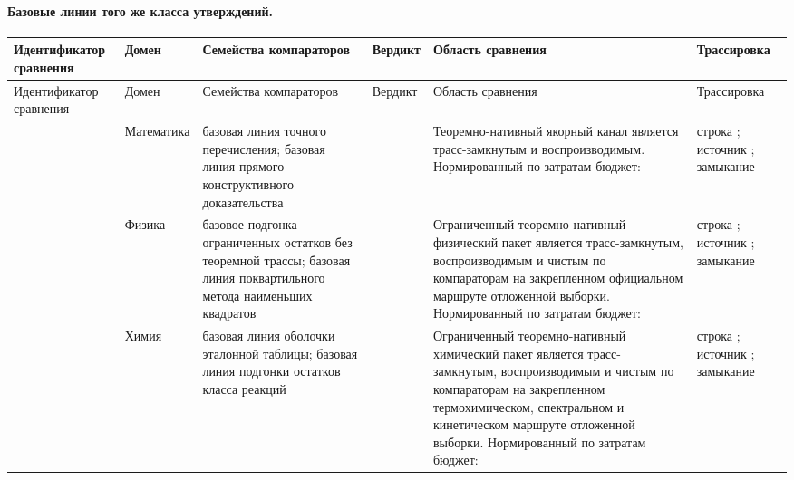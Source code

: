 \paragraph{Базовые линии того же класса утверждений.}
\begingroup
\scriptsize
\setlength{\emergencystretch}{1.5em}
\setlength{\tabcolsep}{2pt}
\setlength{\LTleft}{0pt}
\setlength{\LTright}{0pt}
\begin{longtable}{@{}L{0.14\textwidth}L{0.10\textwidth}L{0.17\textwidth}L{0.10\textwidth}L{0.23\textwidth}L{0.18\textwidth}@{}}
\toprule
Идентификатор сравнения & Домен & Семейства компараторов & Вердикт & Область сравнения & Трассировка \\
\midrule
\endfirsthead
\toprule
Идентификатор сравнения & Домен & Семейства компараторов & Вердикт & Область сравнения & Трассировка \\
\midrule
\endhead
{} & Математика & базовая линия точного перечисления; базовая линия прямого конструктивного доказательства &  & Теоремно-нативный якорный канал является трасс-замкнутым и воспроизводимым. \allowbreak Нормированный по затратам бюджет:  & строка ; \allowbreak источник ; \allowbreak замыкание  \\
 & Физика & базовое подгонка ограниченных остатков без теоремной трассы; базовая линия поквартильного метода наименьших квадратов &  & Ограниченный теоремно-нативный физический пакет является трасс-замкнутым, воспроизводимым и чистым по компараторам на закрепленном официальном маршруте отложенной выборки. \allowbreak Нормированный по затратам бюджет:  & строка ; \allowbreak источник ; \allowbreak замыкание  \\
 & Химия & базовая линия оболочки эталонной таблицы; базовая линия подгонки остатков класса реакций &  & Ограниченный теоремно-нативный химический пакет является трасс-замкнутым, воспроизводимым и чистым по компараторам на закрепленном термохимическом, спектральном и кинетическом маршруте отложенной выборки. \allowbreak Нормированный по затратам бюджет:  & строка ; \allowbreak источник ; \allowbreak замыкание  \\

\end{longtable}
